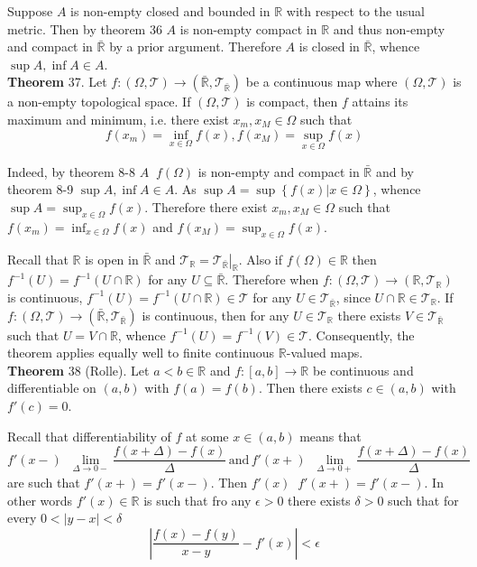 \documentclass[a4paper]{article}
\newcommand{\obj}[1]{\left\{ #1 \right \}}
\newcommand{\clo}[1]{\left [ #1 \right ]}
\newcommand{\brac}[1]{\left ( #1 \right )}
\newcommand{\induc}[1]{\left . #1 \right \vert}
\newcommand{\abs}[1]{\left | #1 \right |}
\newcommand{\Rbar}{{\bar{\mathbb{R}}}}
\newcommand{\Real}{\mathbb{R}}
\newcommand{\Tcal}{\mathcal{T}}
\newcommand{\defn}{\mathop{\overset{\Delta}{=}}\nolimits}
\begin{document}
Suppose $A$ is non-empty closed and bounded in $\Real$ with respect to the usual metric. Then by theorem 36 $A$ is non-empty compact in $\Real$ and thus non-empty and compact in $\Rbar$ by a prior argument. Therefore $A$ is closed in $\Rbar$, whence $\sup A, \inf A\in A$.\\

\label{thm:cont_extrema} \noindent \textbf{Theorem} 37.
Let $f:\brac{\Omega, \Tcal}\to \brac{\Rbar,\Tcal_\Rbar}$ be a continuous map where $\brac{\Omega, \Tcal}$ is a non-empty topological space. If $\brac{\Omega, \Tcal}$ is compact, then $f$ attains its maximum and minimum, i.e. there exist $x_m, x_M\in \Omega$ such that \[f\brac{x_m} = \inf_{x\in \Omega} f\brac{x}, f\brac{x_M} = \sup_{x\in \Omega} f\brac{x}\]

Indeed, by theorem 8-8 $A\defn f\brac{\Omega}$ is non-empty and compact in $\Rbar$ and by theorem 8-9 $\sup A, \inf A\in A$. As $\sup A = \sup \obj{\induc{f\brac{x}} x\in \Omega}$, whence $\sup A = \sup_{x\in \Omega} f\brac{x}$. Therefore there exist $x_m, x_M\in \Omega$ such that $f\brac{x_m} = \inf_{x\in \Omega} f\brac{x}$ and $f\brac{x_M} = \sup_{x\in \Omega} f\brac{x}$.

Recall that $\Real$ is open in $\Rbar$ and $\Tcal_\Real = \induc{\Tcal_\Rbar}_\Real$. Also if $f\brac{\Omega}\in \Real$ then $f^{-1}\brac{U} = f^{-1}\brac{U\cap \Real}$ for any $U\subseteq \Rbar$. Therefore when $f:\brac{\Omega, \Tcal}\to\brac{\Real, \Tcal_\Real}$ is continuous, $f^{-1}\brac{U} = f^{-1}\brac{U\cap \Real} \in \Tcal$ for any $U\in \Tcal_\Rbar$, since $U\cap \Real\in \Tcal_\Real$. If $f:\brac{\Omega, \Tcal}\to\brac{\Rbar, \Tcal_\Rbar}$ is continuous, then for any $U\in \Tcal_\Real$ there exists $V\in \Tcal_\Rbar$ such that $U = V\cap \Real$, whence $f^{-1}\brac{U} = f^{-1}\brac{V} \in \Tcal$. Consequently, the theorem applies equally well to finite continuous $\Real$-valued maps.\\


\label{thm:rolle} \noindent \textbf{Theorem} 38 (Rolle).
Let $a<b\in \Real$ and $f:\clo{a,b}\to\Real$ be continuous and differentiable on $\brac{a,b}$ with $f\brac{a} = f\brac{b}$. Then there exists $c\in \brac{a,b}$ with $f'\brac{c}=0$.

Recall that differentiability of $f$ at some $x\in \brac{a,b}$ means that \[f'\brac{x-}\defn\lim_{\Delta\to 0-}\frac{f\brac{x+\Delta} - f\brac{x} }{\Delta}\,\text{and}\,f'\brac{x+}\defn \lim_{\Delta\to 0+}\frac{f\brac{x+\Delta} - f\brac{x}}{\Delta}\] are such that $f'\brac{x+} = f'\brac{x-}$. Then $f'\brac{x}\defn f'\brac{x+}=f'\brac{x-}$. In other words $f'\brac{x}\in \Real$ is such that fro any $\epsilon>0$ there exists $\delta>0$ such that for every $0<\abs{y-x}<\delta$ \[\abs{ \frac{f\brac{x}-f\brac{y}}{x-y} - f'\brac{x} }<\epsilon\]
\end{document}
